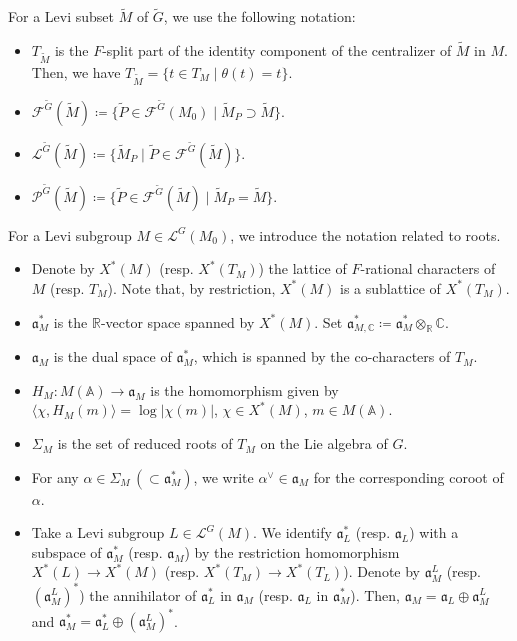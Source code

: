 \documentclass[12pt]{amsart}
\theoremstyle{definition}
\theoremstyle{plain}
\theoremstyle{remark}
\def\C{\mathbb{C}}%
\def\R{\mathbb{R}}%
\def\A{\mathbb{A}}%
\newcommand{\fa}{\mathfrak{a}}
\newcommand{\cF}{\mathcal{F}}
\newcommand{\cL}{\mathcal{L}}
\newcommand{\cP}{\mathcal{P}}
\numberwithin{equation}{section}
\newcommand{\tG}{\widetilde{G}}
\newcommand{\tM}{\widetilde{M}}
\newcommand{\tP}{\widetilde{P}}
\begin{document}
For a Levi subset $\tM$ of $\tG$, we use the following notation:
\begin{itemize}
    \item $T_{\tM}$ is the $F$-split part of the identity component of the centralizer of $\tM$ in $M$. 
    Then, we have $T_{\tM}=\{ t\in T_M \mid \theta(t)=t \}$.
    \item $\cF^{\tG}(\tM)\coloneqq \{ \tP\in\cF^{\tG}(M_0) \mid \tM_P\supset \tM\}$. 
    \item $\cL^{\tG}(\tM)\coloneqq \{ \tM_P \mid \tP\in \cF^{\tG}(\tM)\}$. 
    \item $\cP^{\tG}(\tM) \coloneqq \{ \tP\in \cF^{\tG}(\tM) \mid \tM_P=\tM \}$.
\end{itemize}
For a Levi subgroup $M\in\cL^G(M_0)$, we introduce the notation related to roots.
\begin{itemize}
    \item Denote by $X^*(M)$ (resp. $X^*(T_M)$) the lattice  of $F$-rational characters of $M$ (resp. $T_M$). 
    Note that, by restriction, $X^*(M)$ is a sublattice of $X^*(T_M)$. 
    \item $\fa_M^*$ is the $\R$-vector space spanned by $X^*(M)$. Set $\fa^*_{M,\C}\coloneqq\fa_M^*\otimes_\R \C$. 
    \item $\fa_M$ is the dual space of $\fa_M^*$, which is spanned by the co-characters of $T_M$. 
    \item $H_M\colon M(\A)\to\fa_M$ is the homomorphism given by $\langle \chi,H_M(m) \rangle=\log |\chi(m)|$, $\chi\in X^*(M)$, $m\in M(\A)$. 
    \item $\Sigma_M$ is the set of reduced roots of $T_M$ on the Lie algebra of $G$. 
    \item For any $\alpha\in \Sigma_M\, (\subset\fa_M^*)$, we write $\alpha^\vee\in\fa_M$ for the corresponding coroot of $\alpha$. 
    \item Take a Levi subgroup $L\in\cL^G(M)$.
    We identify $\fa_L^*$ (resp. $\fa_L$) with a subspace of $\fa_M^*$ (resp. $\fa_M$) by the restriction homomorphism $X^*(L)\to X^*(M)$ (resp. $X^*(T_M)\to X^*(T_L)$). 
    Denote by $\fa_M^L$ (resp. $(\fa_M^L)^*$) the annihilator of $\fa_L^*$ in $\fa_M$ (resp. $\fa_L$ in $\fa_M^*$).
    Then, $\fa_M=\fa_L\oplus\fa_M^L$ and $\fa_M^*=\fa_L^*\oplus(\fa_M^L)^*$. %
\end{itemize}
\end{document}
